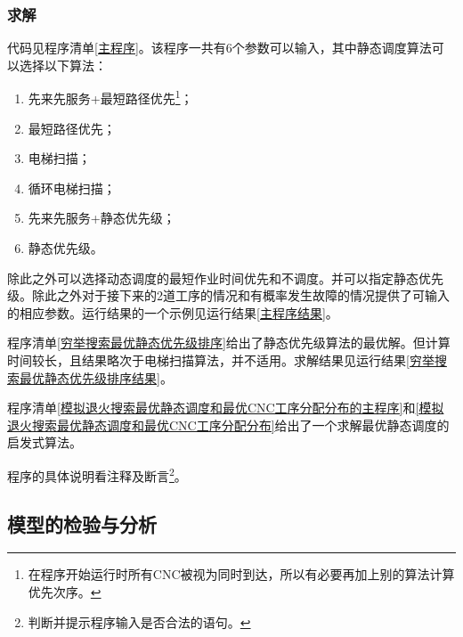 		\subsubsection{求解}
			代码见程序清单\ref{主程序}。该程序一共有6个参数可以输入，其中静态调度算法可以选择以下算法：
			\begin{enumerate}
				\item 先来先服务+最短路径优先\footnote{在程序开始运行时所有CNC被视为同时到达，所以有必要再加上别的算法计算优先次序。}；
				\item 最短路径优先；
				\item 电梯扫描；
				\item 循环电梯扫描；
				\item 先来先服务+静态优先级；
				\item 静态优先级。
			\end{enumerate}
			\par\indent 除此之外可以选择动态调度的最短作业时间优先和不调度。并可以指定静态优先级。除此之外对于接下来的2道工序的情况和有概率发生故障的情况提供了可输入的相应参数。运行结果的一个示例见运行结果\ref{主程序结果}。
			\par\indent 程序清单\ref{穷举搜索最优静态优先级排序}给出了静态优先级算法的最优解。但计算时间较长，且结果略次于电梯扫描算法，并不适用。求解结果见运行结果\ref{穷举搜索最优静态优先级排序结果}。
			\par\indent 程序清单\ref{模拟退火搜索最优静态调度和最优CNC工序分配分布的主程序}和\ref{模拟退火搜索最优静态调度和最优CNC工序分配分布}给出了一个求解最优静态调度的启发式算法。
			\par\indent 程序的具体说明看注释及断言\footnote{判断并提示程序输入是否合法的语句。}。
	\subsection{模型的检验与分析}
